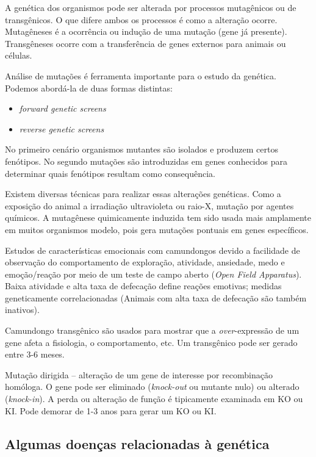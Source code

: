 \documentclass[
	article,			%
	12pt,				%
	oneside,			%
	a4paper,			%
	english,			%
	brazil,				%
	sumario=tradicional
	]{abntex2}
\begin{document}
A genética dos organismos pode ser alterada por processos mutagênicos ou de transgênicos. O que difere ambos os processos é como a alteração ocorre. Mutagêneses é a ocorrência ou indução de uma mutação (gene já presente). Transgêneses ocorre com a transferência de genes externos para animais ou células.

Análise de mutações é ferramenta importante para o estudo da genética. Podemos abordá-la de duas formas distintas:
\begin{itemize}
    \item \textit{forward genetic screens}
    \item \textit{reverse genetic screens}
\end{itemize}
No primeiro cenário organismos mutantes são isolados e produzem certos fenótipos.
No segundo mutações são introduzidas em genes conhecidos para determinar quais fenótipos resultam como consequência.

Existem diversas técnicas para realizar essas alterações genéticas. Como a exposição do animal a irradiação ultravioleta ou raio-X, mutação por agentes químicos.
A mutagênese quimicamente induzida tem sido usada mais amplamente em muitos organismos modelo, pois gera mutações pontuais em genes específicos.

Estudos de características emocionais com camundongos devido a facilidade de observação do comportamento de exploração,	atividade,	ansiedade,	medo	e emoção/reação	por meio de	um teste de	campo	aberto	(\textit{Open	Field Apparatus}). Baixa	atividade	e	alta taxa	de	defecação	define	 reações	emotivas;	 medidas	geneticamente correlacionadas	(Animais	com	alta taxa	de	defecação	são	também	inativos).	

Camundongo	transgênico	são usados	para	mostrar	que	a	\textit{over}-expressão	de	um	gene	afeta	a	fisiologia,	o	
comportamento,	etc. Um	transgênico	pode ser	 gerado	entre	3-6	meses.

Mutação	dirigida	–	alteração	de	um	gene	de	interesse	por recombinação	homóloga. O	gene	pode	ser	eliminado (\textit{knock-out}	ou	mutante	nulo)	ou	alterado (\textit{knock-in}).		A	perda	ou	alteração	de	função	é	tipicamente	examinada	em	KO	ou KI. Pode	demorar	de	1-3	anos para	gerar	um	KO	ou	KI.

\subsection{Algumas doenças relacionadas à genética}
\end{document}
